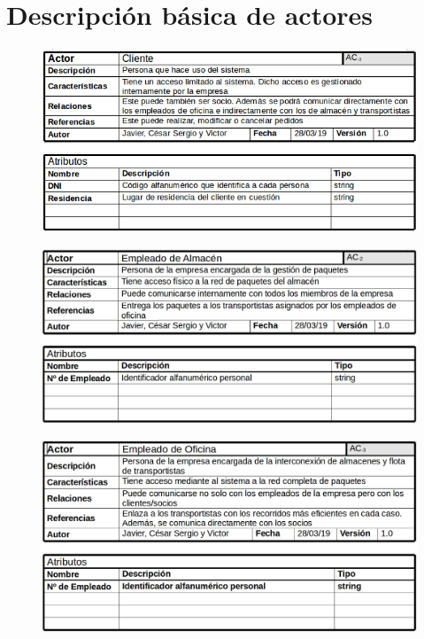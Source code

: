 \section{Descripción básica de actores}
\begin{figure}[H]
	\centering
	\includegraphics[width=16cm]{17}
\end{figure}
\begin{figure}[H]
	\centering
	\includegraphics[width=16cm]{18}
\end{figure}
\begin{figure}[H]
	\centering
	\includegraphics[width=16cm]{19}
\end{figure}
